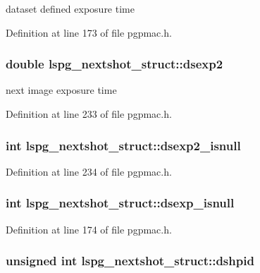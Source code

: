 dataset defined exposure time 

Definition at line 173 of file pgpmac.h.\hypertarget{structlspg__nextshot__struct_a4d8c34309572875352ddabe9cc9001ee}{
\subsubsection[{dsexp2}]{\setlength{\rightskip}{0pt plus 5cm}double {\bf lspg\_\-nextshot\_\-struct::dsexp2}}}
\label{structlspg__nextshot__struct_a4d8c34309572875352ddabe9cc9001ee}


next image exposure time 

Definition at line 233 of file pgpmac.h.\hypertarget{structlspg__nextshot__struct_a45091283dc073e5b7da2cfbe5a75fade}{
\subsubsection[{dsexp2\_\-isnull}]{\setlength{\rightskip}{0pt plus 5cm}int {\bf lspg\_\-nextshot\_\-struct::dsexp2\_\-isnull}}}
\label{structlspg__nextshot__struct_a45091283dc073e5b7da2cfbe5a75fade}


Definition at line 234 of file pgpmac.h.\hypertarget{structlspg__nextshot__struct_ae07498f62ea9c0e2f702b78c87500794}{
\subsubsection[{dsexp\_\-isnull}]{\setlength{\rightskip}{0pt plus 5cm}int {\bf lspg\_\-nextshot\_\-struct::dsexp\_\-isnull}}}
\label{structlspg__nextshot__struct_ae07498f62ea9c0e2f702b78c87500794}


Definition at line 174 of file pgpmac.h.\hypertarget{structlspg__nextshot__struct_a5e260a420176f2973cdb100d0a5c4c09}{
\subsubsection[{dshpid}]{\setlength{\rightskip}{0pt plus 5cm}unsigned int {\bf lspg\_\-nextshot\_\-struct::dshpid}}}
\label{structlspg__nextshot__struct_a5e260a420176f2973cdb100d0a5c4c09}


